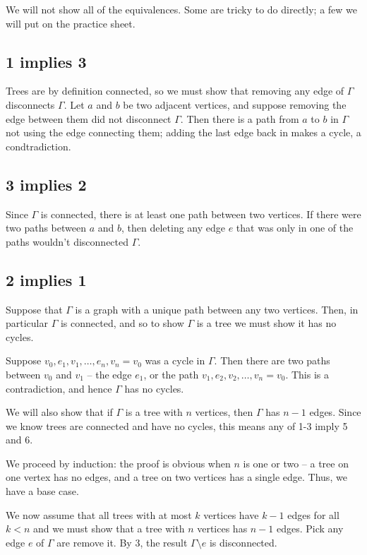 \documentclass[]{article}
\begin{document}
We will not show all of the equivalences. Some are tricky to do
directly; a few we will put on the practice sheet.

\subsection{1 implies 3}\label{implies-3}

Trees are by definition connected, so we must show that removing any
edge of \(\Gamma\) disconnects \(\Gamma\). Let \(a\) and \(b\) be two
adjacent vertices, and suppose removing the edge between them did not
disconnect \(\Gamma\). Then there is a path from \(a\) to \(b\) in
\(\Gamma\) not using the edge connecting them; adding the last edge back
in makes a cycle, a condtradiction.

\subsection{3 implies 2}\label{implies-2}

Since \(\Gamma\) is connected, there is at least one path between two
vertices. If there were two paths between \(a\) and \(b\), then deleting
any edge \(e\) that was only in one of the paths wouldn't disconnected
\(\Gamma\).

\subsection{2 implies 1}\label{implies-1}

Suppose that \(\Gamma\) is a graph with a unique path between any two
vertices. Then, in particular \(\Gamma\) is connected, and so to show
\(\Gamma\) is a tree we must show it has no cycles.

Suppose \(v_0, e_1, v_1,\dots, e_n, v_n=v_0\) was a cycle in \(\Gamma\).
Then there are two paths between \(v_0\) and \(v_1\) -- the edge
\(e_1\), or the path \(v_1, e_2, v_2,\dots, v_n=v_0\). This is a
contradiction, and hence \(\Gamma\) has no cycles.

We will also show that if \(\Gamma\) is a tree with \(n\) vertices, then
\(\Gamma\) has \(n-1\) edges. Since we know trees are connected and have
no cycles, this means any of 1-3 imply 5 and 6.

We proceed by induction: the proof is obvious when \(n\) is one or two
-- a tree on one vertex has no edges, and a tree on two vertices has a
single edge. Thus, we have a base case.

We now assume that all trees with at most \(k\) vertices have \(k-1\)
edges for all \(k<n\) and we must show that a tree with \(n\) vertices
has \(n-1\) edges. Pick any edge \(e\) of \(\Gamma\) are remove it. By
3, the result \(\Gamma\setminus e\) is disconnected.
\end{document}
